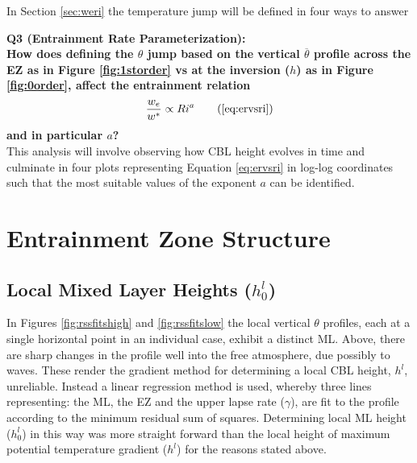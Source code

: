 In Section \ref{sec:weri} the temperature jump will be defined in four ways to answer 

\textbf{Q3 (Entrainment Rate Parameterization):}\\
 
\textbf{How does defining the $\theta$ jump based on the vertical $\overline{\theta}$ profile across the \acs{EZ} as in Figure \ref{fig:1storder} vs at the inversion ($h$) as in Figure \ref{fig:0order}, affect the entrainment relation}
 \begin{equation}
\frac{w_{e}}{w^{*}} \propto Ri^{a} \tag{\ref{eq:ervsri}}
\end{equation}
\textbf{and in particular $a$?}\\

This analysis will involve observing how \acs{CBL} height evolves in time and culminate in four plots representing Equation \ref{eq:ervsri} in log-log coordinates such that the most suitable values of the exponent $a$ can be identified. 
\\ 

\clearpage

\section{Entrainment Zone Structure}
\label{sec:q1}

\subsection{Local Mixed Layer Heights ($h_{0}^{l}$)}
\label{subsec:locmlh}     
\FloatBarrier

In Figures \ref{fig:rssfitshigh} and \ref{fig:rssfitslow} the local vertical $\theta$ profiles,  each at a single horizontal point in an individual case, exhibit a distinct \acs{ML}.  Above, there are sharp changes in the profile well into the free 
atmosphere, due possibly to waves.  These render the gradient method for determining a local \acs{CBL} height, $h^{l}$, 
unreliable.  Instead a linear regression method is used, whereby three lines representing: the
 \acs{ML}, the \acs{EZ} and the upper lapse rate ($\gamma$), are fit to the profile according 
to the minimum residual sum of squares.  Determining local \acs{ML} height ($h_{0}^{l}$) in this way was 
more straight forward than the local height of maximum potential temperature gradient 
($h^{l}$) for the reasons stated above.\\  


